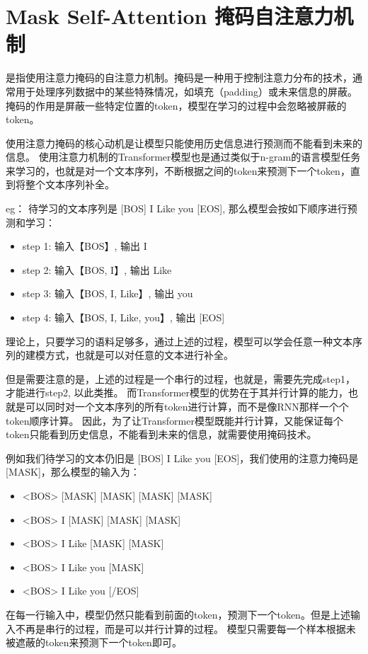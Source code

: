 \documentclass{article}
\begin{document}
\section{Mask Self-Attention 掩码自注意力机制}
是指使用注意力掩码的自注意力机制。掩码是一种用于控制注意力分布的技术，通常用于处理序列数据中的某些特殊情况，如填充（padding）或未来信息的屏蔽。
掩码的作用是屏蔽一些特定位置的token，模型在学习的过程中会忽略被屏蔽的token。

使用注意力掩码的核心动机是让模型只能使用历史信息进行预测而不能看到未来的信息。
使用注意力机制的Transformer模型也是通过类似于n-gram的语言模型任务来学习的，也就是对一个文本序列，不断根据之间的token来预测下一个token，直到将整个文本序列补全。

eg： 待学习的文本序列是 [BOS] I Like you [EOS], 那么模型会按如下顺序进行预测和学习：
\begin{itemize}
    \item step 1: 输入【BOS】, 输出 I 
    \item step 2: 输入【BOS, I】, 输出 Like
    \item step 3: 输入【BOS, I, Like】, 输出 you
    \item   step 4: 输入【BOS, I, Like, you】, 输出 [EOS]
\end{itemize}

理论上，只要学习的语料足够多，通过上述的过程，模型可以学会任意一种文本序列的建模方式，也就是可以对任意的文本进行补全。

但是需要注意的是，上述的过程是一个串行的过程，也就是，需要先完成step1，才能进行step2, 以此类推。
而Transformer模型的优势在于其并行计算的能力，也就是可以同时对一个文本序列的所有token进行计算，而不是像RNN那样一个个token顺序计算。
因此，为了让Transformer模型既能并行计算，又能保证每个token只能看到历史信息，不能看到未来的信息，就需要使用掩码技术。

例如我们待学习的文本仍旧是 [BOS] I Like you [EOS]，我们使用的注意力掩码是[MASK]，那么模型的输入为：
\begin{itemize}
    \item <BOS> [MASK] [MASK] [MASK] [MASK]
    \item <BOS> I [MASK] [MASK] [MASK]
    \item <BOS> I Like [MASK] [MASK]
    \item <BOS> I Like you [MASK]
    \item <BOS> I Like you [/EOS]
\end{itemize}

在每一行输入中，模型仍然只能看到前面的token，预测下一个token。但是上述输入不再是串行的过程，而是可以并行计算的过程。
模型只需要每一个样本根据未被遮蔽的token来预测下一个token即可。
\end{document}
